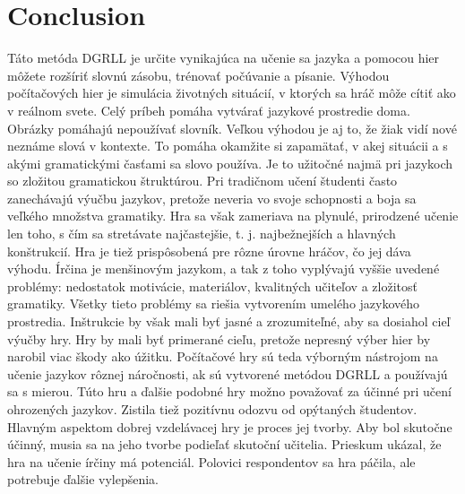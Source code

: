 \documentclass[10pt,twoside,slovak,a4paper]{article}
\begin{document}
\section{Conclusion} \label{zaver}
\qquad Táto metóda DGRLL je určite vynikajúca na učenie sa jazyka a pomocou hier môžete rozšíriť slovnú zásobu, trénovať počúvanie a písanie. Výhodou počítačových hier je simulácia životných situácií, v ktorých sa hráč môže cítiť ako v reálnom svete. Celý príbeh pomáha vytvárať jazykové prostredie doma. Obrázky pomáhajú nepoužívať slovník. Veľkou výhodou je aj to, že žiak vidí nové neznáme slová v kontexte. To pomáha okamžite si zapamätať, v akej situácii a s akými gramatickými časťami sa slovo používa. Je to užitočné najmä pri jazykoch so zložitou gramatickou štruktúrou. Pri tradičnom učení študenti často zanechávajú výučbu jazykov, pretože neveria vo svoje schopnosti a boja sa veľkého množstva gramatiky. Hra sa však zameriava na plynulé, prirodzené učenie len toho, s čím sa stretávate najčastejšie, t. j. najbežnejších a hlavných konštrukcií. Hra je tiež prispôsobená pre rôzne úrovne hráčov, čo jej dáva výhodu. Írčina je menšinovým jazykom, a tak z toho vyplývajú vyššie uvedené problémy: nedostatok motivácie, materiálov, kvalitných učiteľov a zložitosť gramatiky. Všetky tieto problémy sa riešia vytvorením umelého jazykového prostredia. Inštrukcie by však mali byť jasné a zrozumiteľné, aby sa dosiahol cieľ výučby hry. Hry by mali byť primerané cieľu, pretože nepresný výber hier by narobil viac škody ako úžitku. Počítačové hry sú teda výborným nástrojom na učenie jazykov rôznej náročnosti, ak sú vytvorené metódou DGRLL a používajú sa s mierou. Túto hru a ďalšie podobné hry možno považovať za účinné pri učení ohrozených jazykov. Zistila tiež pozitívnu odozvu od opýtaných študentov. Hlavným aspektom dobrej vzdelávacej hry je proces jej tvorby. Aby bol skutočne účinný, musia sa na jeho tvorbe podieľať skutoční učitelia. Prieskum ukázal, že hra na učenie írčiny má potenciál. Polovici respondentov sa hra páčila, ale potrebuje ďalšie vylepšenia.\\




\end{document}
